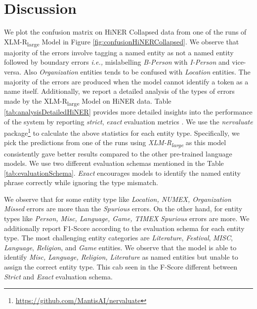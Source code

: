 \documentclass[10pt, a4paper]{article}
\begin{document}
\section{Discussion}
We plot the confusion matrix on HiNER Collapsed data from one of the runs of XLM-R\textsubscript{large} Model in Figure \ref{fig:confusionHiNERCollapsed}. We observe that majority of the errors involve tagging a named entity as not a named entity followed by boundary errors \textit{i.e.,} mislabelling \textit{B-Person} with \textit{I-Person} and vice-versa. Also \textit{Organization} entities tends to be confused with \textit{Location} entities. The majority of the errors are produced when the model cannot identify a token as a name itself. Additionally, we report a detailed analysis of the types of errors made by the XLM-R\textsubscript{large} Model on HiNER data. Table \ref{tab:analysisDetailedHiNER} provides more detailed insights into the performance of the system by reporting \textit{strict}, \textit{exact} evaluation metrics \cite{chinchor-sundheim-1993-muc}. We use the \textit{nervaluate} package\footnote{\url{https://github.com/MantisAI/nervaluate}} to calculate the above statistics for each entity type. Specifically, we pick the predictions from one of the runs using \textit{XLM-R\textsubscript{large}} as this model consistently gave better results compared to the other pre-trained language models. We use two different evaluation schemas mentioned in the Table \ref{tab:evaluationSchema}. \textit{Exact} encourages models to identify the named entity phrase correctly while ignoring the type mismatch.

We observe that for some entity type like \textit{Location, NUMEX, Organization} \textit{Missed} errors are more than the \textit{Spurious} errors. On the other hand, for entity types like \textit{Person, Misc, Language, Game, TIMEX} \textit{Spurious} errors are more. We additionally report F1-Score according to the evaluation schema for each entity type. The most challenging entity categories are \textit{Literature}, \textit{Festival}, \textit{MISC}, \textit{Language}, \textit{Religion}, and \textit{Game} entities. We observe that the model is able to identify \textit{Misc, Language, Religion, Literature} as named entities but unable to assign the correct entity type. This cab seen in the F-Score different between \textit{Strict} and \textit{Exact} evaluation schema. \newline
\end{document}
